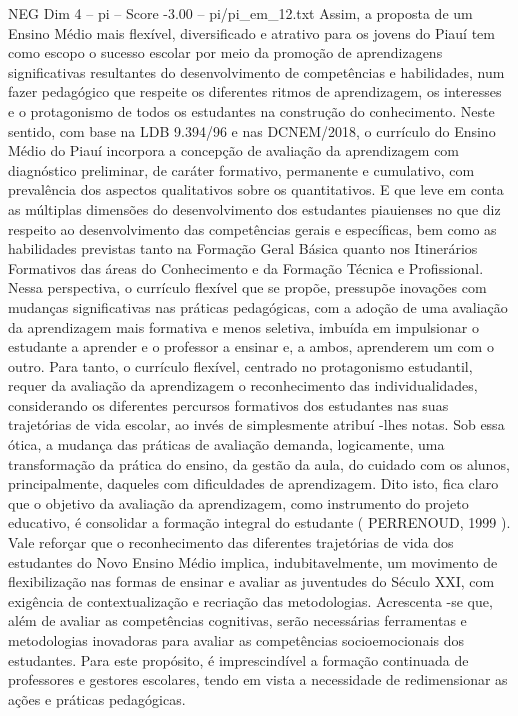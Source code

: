 \begin{textsample}{NEG Dim 4 – pi – Score -3.00 – pi/pi\_em\_12.txt}
Assim, a proposta de um Ensino Médio mais flexível, diversificado e atrativo para os jovens do Piauí tem como escopo o sucesso escolar por meio da promoção de aprendizagens significativas resultantes do desenvolvimento de competências e habilidades, num fazer pedagógico que respeite os diferentes ritmos de aprendizagem, os interesses e o protagonismo de todos os estudantes na construção do conhecimento.
Neste sentido, com base na LDB 9.394/96 e nas DCNEM/2018, o currículo do Ensino Médio do Piauí incorpora a concepção de avaliação da aprendizagem com diagnóstico preliminar, de caráter formativo, permanente e cumulativo, com prevalência dos aspectos qualitativos sobre os quantitativos.
E que leve em conta as múltiplas dimensões do desenvolvimento dos estudantes piauienses no que diz respeito ao desenvolvimento das competências gerais e específicas, bem como as habilidades previstas tanto na Formação Geral Básica quanto nos Itinerários Formativos das áreas do Conhecimento e da Formação Técnica e Profissional.
Nessa perspectiva, o currículo flexível que se propõe, pressupõe inovações com mudanças significativas nas práticas pedagógicas, com a adoção de uma avaliação da aprendizagem mais formativa e menos seletiva, imbuída em impulsionar o estudante a aprender e o professor a ensinar e, a ambos, aprenderem um com o outro.
Para tanto, o currículo flexível, centrado no protagonismo estudantil, requer da avaliação da aprendizagem o reconhecimento das individualidades, considerando os diferentes percursos formativos dos estudantes nas suas trajetórias de vida escolar, ao invés de simplesmente atribuí -lhes notas.
Sob essa ótica, a mudança das práticas de avaliação demanda, logicamente, uma transformação da prática do ensino, da gestão da aula, do cuidado com os alunos, principalmente, daqueles com dificuldades de aprendizagem.
Dito isto, fica claro que o objetivo da avaliação da aprendizagem, como instrumento do projeto educativo, é consolidar a formação integral do estudante ( PERRENOUD, 1999 ).
Vale reforçar que o reconhecimento das diferentes trajetórias de vida dos estudantes do Novo Ensino Médio implica, indubitavelmente, um movimento de flexibilização nas formas de ensinar e avaliar as juventudes do Século XXI, com exigência de contextualização e recriação das metodologias.
Acrescenta -se que, além de avaliar as competências cognitivas, serão necessárias ferramentas e metodologias inovadoras para avaliar as competências socioemocionais dos estudantes.
Para este propósito, é imprescindível a formação continuada de professores e gestores escolares, tendo em vista a necessidade de redimensionar as ações e práticas pedagógicas.

\end{textsample}
